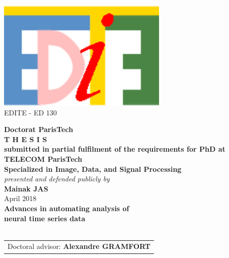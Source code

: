 \documentclass[12pt,a4paper]{book}
\renewcommand\textnumero{n$^{\textsf{{\tiny O}}}$}
\begin{document}
\begin{center}
%


\includegraphics[scale=0.65]{logo_edite.pdf} \\
{\small {EDITE - ED 130}}


%
\vspace{.5cm}
%
%
%
%
%
%
\vspace{1.0cm}
%
%
%
{\LARGE {\bf Doctorat ParisTech}}\\
\vspace{1.1cm}
{\LARGE {\bf T H E S I S}}\\
\vspace{0.5cm}
{\normalsize {\bf submitted in partial fulfilment of the requirements for PhD at}}\\
%
%
%
\vspace{.9cm}
%
%
%
%
{\LARGE {\bf TELECOM ParisTech}}\\
\vspace{0.6cm}
{\Large {\bf Specialized in Image, Data, and Signal Processing}}\\
%
%
%
\vspace{.8cm}
%
%
%
{\normalsize {\it presented and defended publicly by}}\\
\vspace{0.7cm}
{\Large {\bf Mainak JAS}}\\
\vspace{0.24cm}
{\normalsize April 2018}\\
%
%
%
\vfill
%
%
%
\textcolor[RGB]{191,18,56}{
\noindent
{\LARGE {\bf Advances in automating analysis of\\[.6cm]neural time series data}}\\
}
%
%
%
\vfill~\vfill
%
%
%
{\normalsize
\begin{tabular}{c}
Doctoral advisor:					{\bf Alexandre GRAMFORT}
\end{tabular}
}
\end{center}
\end{document}
